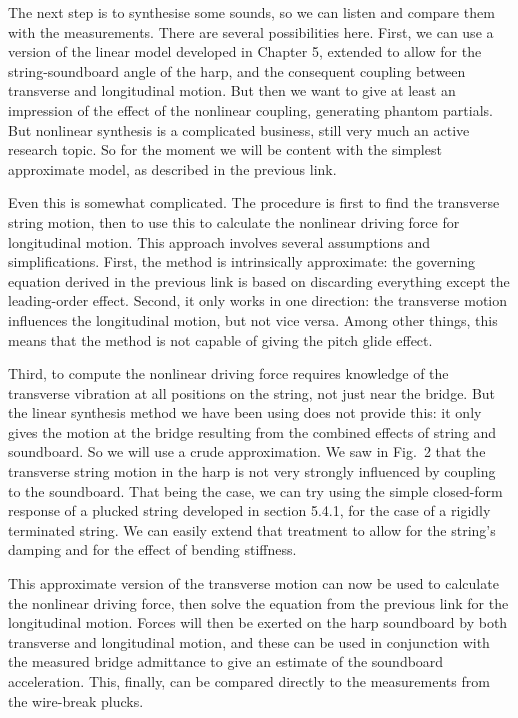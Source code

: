   The next step is to synthesise some sounds, so we can listen and compare them 
  with the measurements. There are several possibilities here. First, we can 
  use a version of the linear model developed in Chapter 5, extended to allow 
  for the string-soundboard angle of the harp, and the consequent coupling 
  between transverse and longitudinal motion. But then we want to give at least 
  an impression of the effect of the nonlinear coupling, generating phantom 
  partials. But nonlinear synthesis is a complicated business, still very much 
  an active research topic. So for the moment we will be content with the 
  simplest approximate model, as described in the previous link. 

  Even this is somewhat complicated. The procedure is first to find the 
  transverse string motion, then to use this to calculate the nonlinear driving 
  force for longitudinal motion. This approach involves several assumptions and 
  simplifications. First, the method is intrinsically approximate: the 
  governing equation derived in the previous link is based on discarding 
  everything except the leading-order effect. Second, it only works in one 
  direction: the transverse motion influences the longitudinal motion, but not 
  vice versa. Among other things, this means that the method is not capable of 
  giving the pitch glide effect. 

  Third, to compute the nonlinear driving force requires knowledge of the 
  transverse vibration at all positions on the string, not just near the 
  bridge. But the linear synthesis method we have been using does not provide 
  this: it only gives the motion at the bridge resulting from the combined 
  effects of string and soundboard. So we will use a crude approximation. We 
  saw in Fig.\ 2 that the transverse string motion in the harp is not very 
  strongly influenced by coupling to the soundboard. That being the case, we 
  can try using the simple closed-form response of a plucked string developed 
  in section 5.4.1, for the case of a rigidly terminated string. We can easily 
  extend that treatment to allow for the string’s damping and for the effect of 
  bending stiffness. 

  This approximate version of the transverse motion can now be used to 
  calculate the nonlinear driving force, then solve the equation from the 
  previous link for the longitudinal motion. Forces will then be exerted on the 
  harp soundboard by both transverse and longitudinal motion, and these can be 
  used in conjunction with the measured bridge admittance to give an estimate 
  of the soundboard acceleration. This, finally, can be compared directly to 
  the measurements from the wire-break plucks. 

